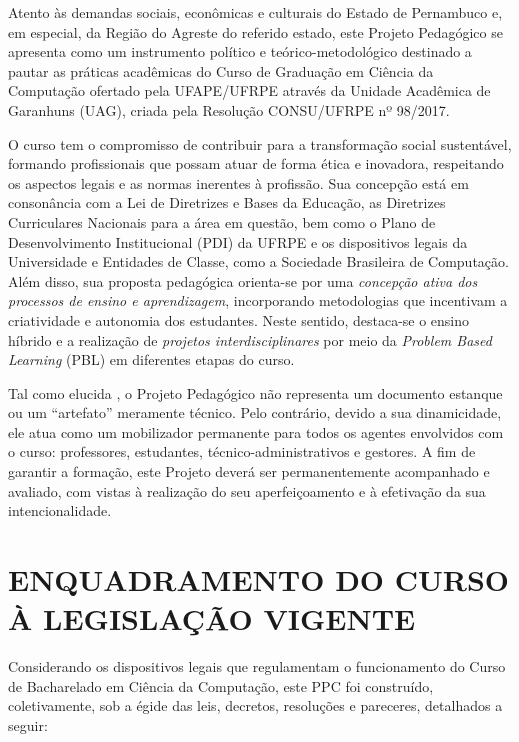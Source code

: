 \documentclass[
	12pt,				%
	openright,			%
  oneside,     %
	a4paper,			%
	chapter=TITLE,		%
	english,			%
	french,				%
	spanish,			%
	brazil				%
	]{abntex2}
\begin{document}
Atento às demandas sociais, econômicas e culturais do Estado de Pernambuco e, em especial, da Região do Agreste do referido estado, este Projeto Pedagógico se apresenta como um instrumento político e teórico-metodológico destinado a pautar as práticas acadêmicas do Curso de Graduação em Ciência da Computação ofertado pela UFAPE/UFRPE através da Unidade Acadêmica de Garanhuns (UAG), criada pela Resolução CONSU/UFRPE nº 98/2017.

O curso tem o compromisso de contribuir para a transformação social sustentável, formando profissionais que possam atuar de forma ética e inovadora, respeitando os aspectos legais e as normas inerentes à profissão. Sua concepção está em consonância com a Lei de Diretrizes e Bases da Educação, as Diretrizes Curriculares Nacionais para a área em questão, bem como o Plano de Desenvolvimento Institucional (PDI) da UFRPE e os dispositivos legais da Universidade e Entidades de Classe, como a Sociedade Brasileira de Computação. Além disso, sua proposta pedagógica orienta-se por uma \textit{concepção ativa dos processos de ensino e aprendizagem}, incorporando metodologias que incentivam a criatividade e autonomia dos estudantes. Neste sentido, destaca-se o ensino híbrido e a realização de \textit{projetos interdisciplinares} por meio da \textit{Problem Based Learning} (PBL) em diferentes etapas do curso.

Tal como elucida , o Projeto Pedagógico não representa um documento estanque ou um ``artefato'' meramente técnico. Pelo contrário, devido a sua dinamicidade, ele atua como um mobilizador permanente para todos os agentes envolvidos com o curso: professores, estudantes, técnico-administrativos e gestores. A fim de garantir a formação, este Projeto deverá ser permanentemente acompanhado e avaliado, com vistas à realização do seu aperfeiçoamento e à efetivação da sua intencionalidade.



\chapter{ENQUADRAMENTO DO CURSO À LEGISLAÇÃO VI\-GEN\-TE}

Considerando os dispositivos legais que regulamentam o funcionamento do Curso de Bacharelado em Ciência da Computação, este PPC foi construído, coletivamente, sob a égide das leis, decretos, resoluções e pareceres, detalhados a seguir:
\end{document}
